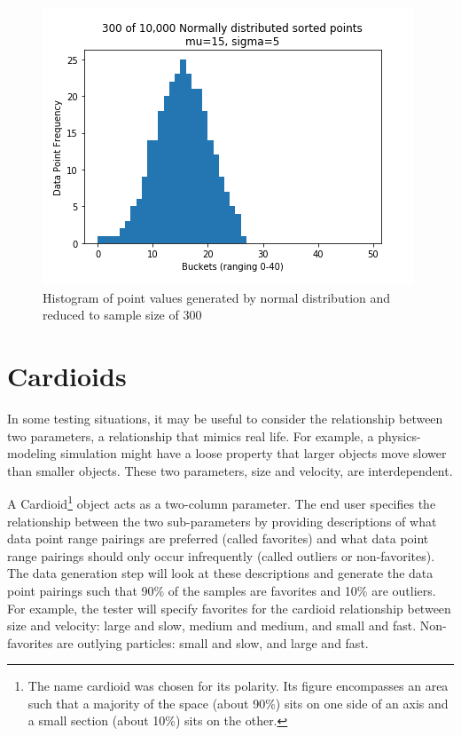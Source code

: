 \begin{figure}[H]
\centering
\includegraphics[scale=0.7]{law3.png}
\caption{Histogram of point values generated by normal distribution and reduced to sample size of 300}
\label{fig:law3}
\end{figure}


\section{Cardioids}

In some testing situations, it may be useful to consider the relationship between two parameters, a relationship that mimics real life. For example, a physics-modeling simulation might have a loose property that larger objects move slower than smaller objects. These two parameters, size and velocity, are interdependent.

A Cardioid\footnote{The name cardioid was chosen for its polarity. Its figure encompasses an area such that a majority of the space (about 90\%) sits on one side of an axis and a small section (about 10\%) sits on the other.} object acts as a two-column parameter. The end user specifies the relationship between the two sub-parameters by providing descriptions of what data point range pairings are preferred (called favorites) and what data point range pairings should only occur infrequently (called outliers or non-favorites). The data generation step will look at these descriptions and generate the data point pairings such that 90\% of the samples are favorites and 10\% are outliers. For example, the tester will specify favorites for the cardioid relationship between size and velocity: large and slow, medium and medium, and small and fast. Non-favorites are outlying particles: small and slow, and large and fast.

